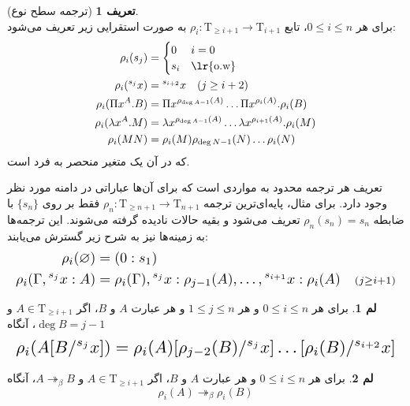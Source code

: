 \documentclass[11pt,twocolumn,a4paper,twoside]{article}
\theoremstyle{definition}
\newtheorem{definition}{تعریف}[section]
\theoremstyle{theorem}
\theoremstyle{definition}
\newtheorem{lemma}{لم}[section]
\theoremstyle{definition}
\theoremstyle{definition}
\theoremstyle{definition}
\theoremstyle{definition}
\newcommand{\resizedalign}[1]{%
  \[
  \resizebox{\columnwidth}{!}{$
    \begin{aligned}
      #1
    \end{aligned}
  $}
  \]
}
\begin{document}
\begin{definition}[ترجمه سطح نوع]\label{rho_def}
\hfil{}\\
برای هر
$0 \le i \le n$،
تابع
$\rho_i : \mathrm{T}_{\ge i+1} \to \mathrm{T}_{i+1}$
به صورت استقرایی زیر تعریف می‌شود:
\vspace{-5pt}
\begin{align*}
\rho_i(s_j) &= 
    \begin{cases}
        0 &i = 0\\
        s_i &\text{\lr{o.w}}
    \end{cases}\\
\rho_i({}^{s_j}x) &= {}^{s_{i+2}}x \quad (j \ge i+2)\\
\rho_i(\Pi x^A.B) &= \Pi x^{\rho_{\operatorname{deg} A-1}(A)} \dots \Pi x^{\rho_{i}(A)}.\rho_i(B)\\
\rho_i(\lambda x^A.M) &= \lambda x^{\rho_{\operatorname{deg} A-1}(A)} \dots \lambda x^{\rho_{i+1}(A)}.\rho_i(M)\\
\rho_i(MN) &= \rho_i(M) \rho_{\operatorname{deg} N-1}(N) \dots \rho_i(N)
\end{align*}
که در آن
یک متغیر منحصر به فرد است.

تعریف هر ترجمه محدود به مواردی است که برای آن‌ها عباراتی در دامنه مورد نظر وجود دارد. برای مثال، پایه‌ای‌ترین ترجمه
$\rho_n : \mathrm{T}_{\ge n+1} \to \mathrm{T}_{n+1}$
فقط بر روی
$\{s_n\}$
با ضابطه
$\rho_n(s_n) = s_n$
تعریف می‌شود و بقیه حالات نادیده گرفته می‌شوند. این ترجمه‌ها به زمینه‌ها نیز به شرح زیر گسترش می‌یابند:
\vspace{-5pt}
\resizedalign{
\rho_i(\varnothing) &= (0 : s_1)\\
\rho_i(\Gamma,{}^{s_{j}}x:A) &= \rho_i(\Gamma),{}^{s_{j}}x:\rho_{j-1}(A),\dots,{}^{s_{i+1}}x:\rho_{i}(A) \quad{\scriptstyle (j \ge i+1)}
}
\end{definition}

\begin{lemma}
برای هر
$0 \le i \le n$
و هر
$1 \le j \le n$
و هر عبارت
$A$ و $B$،
اگر
$A \in \mathrm{T}_{\ge i+1}$ و $\operatorname{deg} B = j-1$، آنگاه
\vspace{-5pt}
\resizedalign{
\rho_i(A[B/{}^{s_j}x]) = \rho_i(A)[\rho_{j-2}(B)/{}^{s_j}x] \dots [\rho_{i}(B)/{}^{s_{i+2}}x]
}
\end{lemma}

\begin{lemma}
برای هر
$0 \le i \le n$
و هر عبارت
$A$ و $B$،
اگر
$A \in \mathrm{T}_{\ge i+1}$ و $A \twoheadrightarrow_\beta B$، آنگاه
\vspace{-5pt}
\begin{equation*}
\rho_i(A) \twoheadrightarrow_\beta \rho_i(B)
\end{equation*}
\end{lemma}
\end{document}
